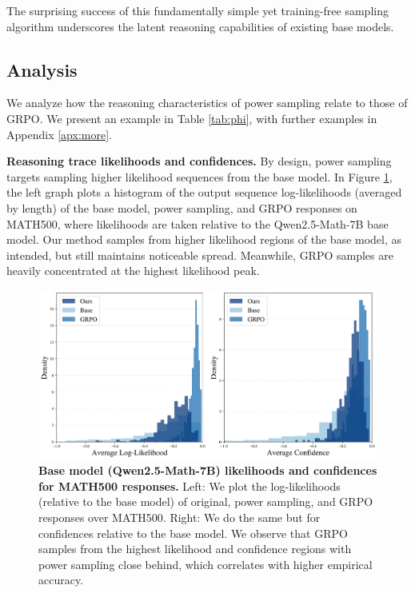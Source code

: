 \documentclass{article}
\renewcommand{\paragraph}[1]{\vspace{.1em}\noindent\textbf{#1}}
\begin{document}
The surprising success of this fundamentally simple yet training-free sampling algorithm underscores the latent reasoning capabilities of existing base models. 


\subsection{Analysis}
We analyze how the reasoning characteristics of power sampling relate to those of GRPO. We present an example in Table \ref{tab:phi}, with further examples in Appendix \ref{apx:more}. 

\paragraph{Reasoning trace likelihoods and confidences.} By design, power sampling targets sampling higher likelihood sequences from the base model. In Figure \ref{fig:conf}, the left graph plots a histogram of the output sequence log-likelihoods (averaged by length) of the base model, power sampling, and GRPO responses on MATH500, where likelihoods are taken relative to the Qwen2.5-Math-7B base model. Our method samples from higher likelihood regions of the base model, as intended, but still maintains noticeable spread. Meanwhile, GRPO samples are heavily concentrated at the highest likelihood peak. 

\begin{figure}[h!]
  \centering
  \includegraphics[width=\linewidth]{combined_hists.pdf}
  \vspace{-15pt}
  \captionsetup{font=small}
  \caption{\textbf{ Base model (Qwen2.5-Math-7B) likelihoods and confidences for MATH500 responses.} Left: We plot the log-likelihoods (relative to the base model) of original, power sampling, and GRPO responses over MATH500. Right: We do the same but for confidences relative to the base model. We observe that GRPO samples from the highest likelihood and confidence regions with power sampling close behind, which correlates with higher empirical accuracy.}
  \label{fig:conf}
  \vspace{-8pt}
\end{figure}
\end{document}
